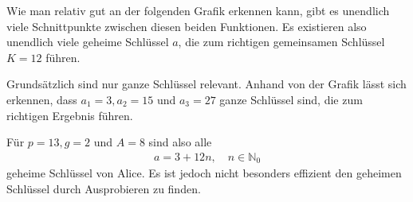 \documentclass[twocolumn]{report}
\begin{document}
Wie man relativ gut an der folgenden Grafik erkennen kann,
gibt es unendlich viele Schnittpunkte zwischen diesen beiden
Funktionen. Es existieren also unendlich viele geheime Schlüssel $a$,
die zum richtigen gemeinsamen Schlüssel $K=12$ führen.

\begin{center}
\end{center}
Grundsätzlich sind nur ganze Schlüssel relevant.
Anhand von der Grafik lässt sich erkennen, dass
$a_1=3,a_2=15$ und $a_3=27$ ganze Schlüssel sind,
die zum richtigen Ergebnis führen.

Für $p=13,g=2$ und $A=8$ sind also alle
\begin{align}
    a=3+12n,\quad n\in\mathbb{N}_0  
\end{align}
geheime Schlüssel von Alice.
Es ist jedoch nicht besonders effizient den geheimen Schlüssel
durch Ausprobieren zu finden.
\end{document}
